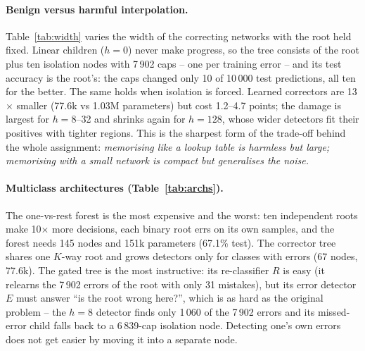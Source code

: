 \begin{table}[t]
\centering\small
\caption{Width of the binary nodes (CIFAR-10, ResNet trunk, corrector tree; root fixed at
$128\!\to\!64\!\to\!10$, 84.2\% train / 74.5\% test). ``Isolation only'' replaces every child by a
closed-form isolation node.}
\label{tab:width}
\resizebox{\linewidth}{!}{}
\end{table}

\paragraph{Benign versus harmful interpolation.} Table~\ref{tab:width} varies the width of the
correcting networks with the root held fixed. Linear children ($h=0$) never make progress, so the
tree consists of the root plus ten isolation nodes with 7\,902 caps -- one per training error -- and
its test accuracy is the root's: the caps changed only 10 of 10\,000 test predictions, all ten for
the better. The same holds when isolation is forced. Learned correctors are 13$\times$ smaller
(77.6k vs 1.03M parameters) but cost 1.2--4.7 points; the damage is largest for $h=8$--32 and
shrinks again for $h=128$, whose wider detectors fit their positives with tighter regions. This is
the sharpest form of the trade-off behind the whole assignment: \emph{memorising like a lookup table is
harmless but large; memorising with a small network is compact but generalises the noise.}

\begin{table}[t]
\centering\small
\caption{Multiclass extensions (CIFAR-10, ResNet trunk, $h=8$).}
\label{tab:archs}
\resizebox{\linewidth}{!}{}
\end{table}

\paragraph{Multiclass architectures (Table~\ref{tab:archs}).} The one-vs-rest forest is the most
expensive and the worst: ten independent roots make 10$\times$ more decisions, each binary root
errs on its own samples, and the forest needs 145 nodes and 151k parameters (67.1\% test). The
corrector tree shares one $K$-way root and grows detectors only for classes with errors (67 nodes,
77.6k). The gated tree is the most instructive: its re-classifier $R$ is easy (it relearns the 7\,902
errors of the root with only 31 mistakes), but its error detector $E$ must answer ``is the root wrong
here?'', which is as hard as the original problem -- the $h=8$ detector finds only 1\,060 of the 7\,902
errors and its missed-error child falls back to a 6\,839-cap isolation node. Detecting one's own errors
does not get easier by moving it into a separate node.

